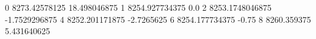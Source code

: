 0 8273.42578125 18.498046875
1 8254.927734375 0.0
2 8253.1748046875 -1.7529296875
4 8252.201171875 -2.7265625
6 8254.177734375 -0.75
8 8260.359375 5.431640625

